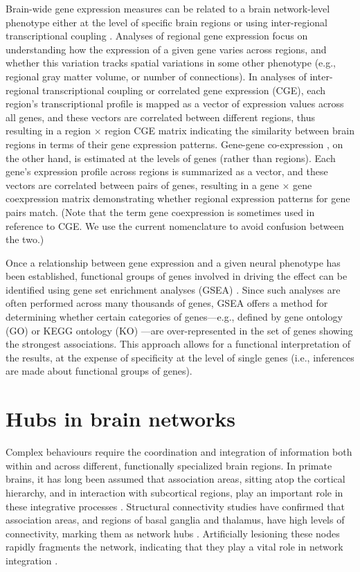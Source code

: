 Brain-wide gene expression measures can be related to a brain network-level phenotype either at the level of specific brain regions \citep{Myers2007,Rittman2016,Vertes2016b,Parkes2017} or using inter-regional transcriptional coupling \citep{Richiardi2015,Fulcher2016,Arnatkeviciute2018,Romero-Garcia2018}. Analyses of regional gene expression focus on understanding how the expression of a given gene varies across regions, and whether this variation tracks spatial variations in some other phenotype (e.g., regional gray matter volume, or number of connections). In analyses of inter-regional transcriptional coupling or correlated gene expression (CGE), each region’s transcriptional profile is mapped as a vector of expression values across all genes, and these vectors are correlated between different regions, thus resulting in a region $\times$ region CGE matrix indicating the similarity between brain regions in terms of their gene expression patterns. Gene-gene co-expression \citep{Eising2016,Keo2017,Negi2017}, on the other hand, is estimated at the levels of genes (rather than regions). Each gene’s expression profile across regions is summarized as a vector, and these vectors are correlated between pairs of genes, resulting in a gene $\times$ gene coexpression matrix demonstrating whether regional expression patterns for gene pairs match. (Note that the term gene coexpression is sometimes used in reference to CGE. We use the current nomenclature to avoid confusion between the two.)

Once a relationship between gene expression and a given neural phenotype has been established, functional groups of genes involved in driving the effect can be identified using gene set enrichment analyses (GSEA) \citep{Subramanian2005,Irizarry2009}.
Since such analyses are often performed across many thousands of genes, GSEA offers a method for determining whether certain categories of genes---e.g., defined by gene ontology (GO) \citep{Ashburner2000} or KEGG ontology (KO) \citep{Kanehisa2000}---are over-represented in the set of genes showing the strongest associations. This approach allows for a functional interpretation of the results, at the expense of specificity at the level of single genes (i.e., inferences are made about functional groups of genes).

\section{Hubs in brain networks}

Complex behaviours require the coordination and integration of information both within and across different, functionally specialized brain regions. In primate brains, it has long been assumed that association areas, sitting atop the cortical hierarchy, and in interaction with subcortical regions, play an important role in these integrative processes \citep{Felleman,Mesulam1998,Meyer2009a}.
Structural connectivity  studies have confirmed that association areas, and regions of basal ganglia and thalamus, have high levels of connectivity, marking them as network hubs \citep{VandenHeuvel2011}.
Artificially lesioning these nodes rapidly fragments the network, indicating that they play a vital role in network integration \citep{Albert2000,VandenHeuvel2011}.

